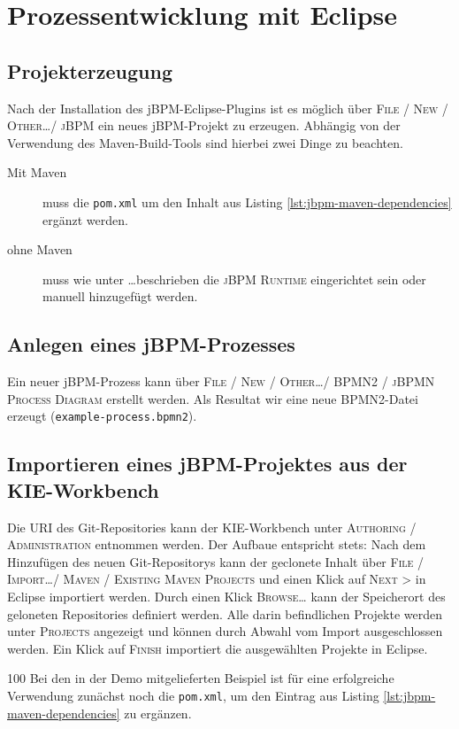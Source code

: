 \section{Prozessentwicklung mit Eclipse}
\subsection{Projekterzeugung}
Nach der Installation des jBPM-Eclipse-Plugins ist es möglich über \textsc{File / New / Other\ldots / jBPM} ein neues jBPM-Projekt zu erzeugen. Abhängig von der Verwendung des Maven-Build-Tools sind hierbei zwei Dinge zu beachten.
\begin{description}
	\item[Mit Maven]  muss die \texttt{pom.xml} um den Inhalt aus Listing \ref{lst:jbpm-maven-dependencies} ergänzt werden.
	\item[ohne Maven] muss wie unter \ldots beschrieben die \textsc{jBPM Runtime} eingerichtet sein oder manuell hinzugefügt werden.
\end{description}

\subsection{Anlegen eines jBPM-Prozesses}
Ein neuer jBPM-Prozess kann über \textsc{File / New / Other\ldots / BPMN2 / jBPMN Process Diagram} erstellt werden. Als Resultat wir eine neue BPMN2-Datei erzeugt (\zb\texttt{example-process.bpmn2}).

\subsection{Importieren eines jBPM-Projektes aus der KIE-Workbench}
Die URI des Git-Repositories kann der KIE-Workbench unter \textsc{Authoring / Administration} entnommen werden. Der Aufbaue entspricht stets:
Nach dem Hinzufügen des neuen Git-Repositorys kann der geclonete Inhalt über \textsc{File / Import\ldots / Maven / Existing Maven Projects} und einen Klick auf \textsc{Next >} in Eclipse importiert werden. Durch einen Klick \textsc{Browse\ldots} kann der Speicherort des geloneten Repositories definiert werden. Alle darin befindlichen Projekte werden unter \textsc{Projects} angezeigt und können durch Abwahl vom Import ausgeschlossen werden. Ein Klick auf \textsc{Finish} importiert die ausgewählten Projekte in Eclipse.
\begin{info}{100}
 Bei den in der Demo mitgelieferten Beispiel ist für eine erfolgreiche Verwendung zunächst noch die \texttt{pom.xml}, um den Eintrag aus Listing \ref{lst:jbpm-maven-dependencies} zu ergänzen.
\end{info}